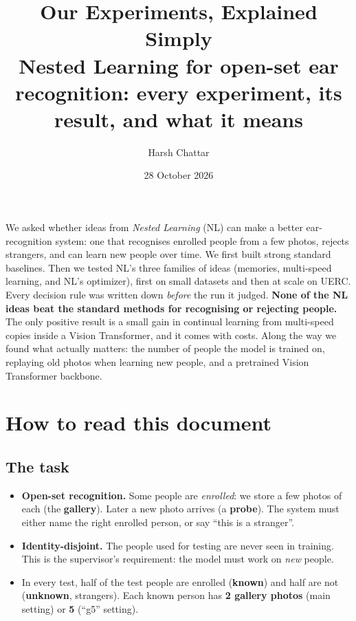 \documentclass[11pt,a4paper]{article}
\title{\textbf{Our Experiments, Explained Simply}\\[0.3em]
\large Nested Learning for open-set ear recognition: every experiment, its result, and what it means}
\author{Harsh Chattar}
\date{28 October 2026}
\begin{document}
\maketitle

\begin{means}
We asked whether ideas from \emph{Nested Learning} (NL) can make a better ear-recognition system: one that recognises enrolled people from a few photos, rejects strangers, and can learn new people over time. We first built strong standard baselines. Then we tested NL's three families of ideas (memories, multi-speed learning, and NL's optimizer), first on small datasets and then at scale on UERC. Every decision rule was written down \emph{before} the run it judged. \textbf{None of the NL ideas beat the standard methods for recognising or rejecting people.} The only positive result is a small gain in continual learning from multi-speed copies inside a Vision Transformer, and it comes with costs. Along the way we found what actually matters: the number of people the model is trained on, replaying old photos when learning new people, and a pretrained Vision Transformer backbone.
\end{means}

\tableofcontents
\newpage

\setcounter{section}{-1}
\section{How to read this document}

\subsection{The task}
\begin{itemize}
  \item \textbf{Open-set recognition.} Some people are \emph{enrolled}: we store a few photos of each (the \textbf{gallery}). Later a new photo arrives (a \textbf{probe}). The system must either name the right enrolled person, or say ``this is a stranger''.
  \item \textbf{Identity-disjoint.} The people used for testing are never seen in training. This is the supervisor's requirement: the model must work on \emph{new} people.
  \item In every test, half of the test people are enrolled (\textbf{known}) and half are not (\textbf{unknown}, strangers). Each known person has \textbf{2 gallery photos} (main setting) or \textbf{5} (``g5'' setting).
\end{itemize}
\end{document}
